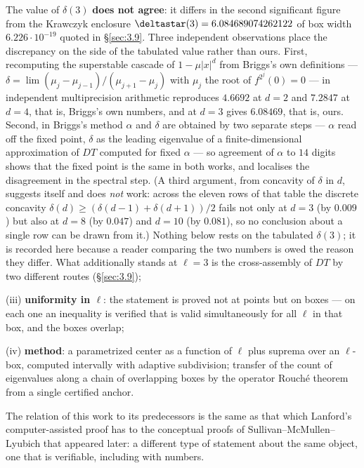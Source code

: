 The value of $\delta(3)$ \textbf{does not agree}: it differs in the second
significant figure from the Krawczyk enclosure $\deltastar(3) = 6.084689074262122$
of box width $6.226\cdot 10^{-19}$ quoted in \S\ref{sec:3.9}. Three independent
observations place the discrepancy on the side of the tabulated value rather than
ours. First, recomputing the superstable cascade of $1-\mu|x|^{d}$ from Briggs's
own definitions --- $\delta = \lim(\mu_j-\mu_{j-1})/(\mu_{j+1}-\mu_j)$ with $\mu_j$
the root of $f^{2^{j}}(0)=0$ --- in independent multiprecision arithmetic
reproduces $4.6692$ at $d=2$ and $7.2847$ at $d=4$, that is, Briggs's own numbers,
and at $d=3$ gives $6.08469$, that is, ours. Second, in Briggs's method $\alpha$ and $\delta$ are
obtained by two separate steps --- $\alpha$ read off the fixed point, $\delta$ as the
leading eigenvalue of a finite-dimensional approximation of $DT$ computed for fixed
$\alpha$ --- so agreement of $\alpha$ to $14$ digits shows that the fixed point is
the same in both works, and localises the disagreement in the spectral step.
(A third argument, from concavity of $\delta$ in $d$, suggests itself and does
\emph{not} work: across the eleven rows of that table the discrete concavity
$\delta(d) \ge (\delta(d-1)+\delta(d+1))/2$ fails not only at $d = 3$ (by
$0.009$) but also at $d = 8$ (by $0.047$) and $d = 10$ (by $0.081$), so no
conclusion about a single row can be drawn from it.)
Nothing below rests on the tabulated $\delta(3)$; it is recorded here because a
reader comparing the two numbers is owed the reason they differ. What additionally
stands at $\ell = 3$ is the cross-assembly of $DT$ by two different routes
(\S\ref{sec:3.9});

(iii) \textbf{uniformity in $\ell$}: the statement is proved not at points but
on boxes --- on each one an inequality is verified that is valid simultaneously
for all $\ell$ in that box, and the boxes overlap;

(iv) \textbf{method}: a parametrized center as a function of $\ell$ plus suprema over an
$\ell$-box, computed intervally with adaptive subdivision; transfer of the
count of eigenvalues along a chain of overlapping boxes by the operator Rouché
theorem from a single certified anchor.

The relation of this work to its predecessors is the same as that which Lanford's
computer-assisted proof has to the conceptual proofs of Sullivan--McMullen--Lyubich
that appeared later: a different type of statement about the same object, one
that is verifiable, including with numbers.

